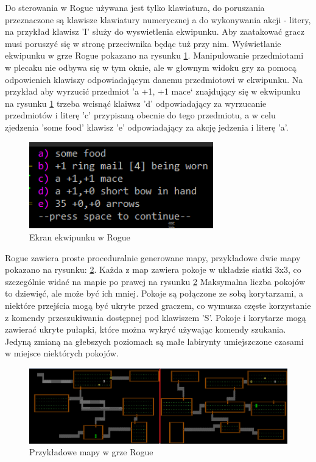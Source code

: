 \documentclass[12pt,twoside]{article}
\begin{document}
Do sterowania w Rogue używana jest tylko klawiatura, do poruszania przeznaczone są klawisze klawiatury numerycznej a do wykonywania akcji -  litery, na przykład klawisz 'I' służy do wyswietlenia ekwipunku. Aby zaatakować gracz musi poruszyć się w stronę przeciwnika będąc tuż przy nim. Wyświetlanie ekwipunku w grze Rogue pokazano na rysunku \ref{Rogue:scr2}. Manipulowanie przedmiotami w plecaku nie odbywa się w tym oknie, ale w głownym widoku gry za pomocą odpowienich klawiszy odpowiadającym danemu przedmiotowi w ekwipunku. Na przykład aby wyrzucić przedmiot 'a +1, +1 mace` znajdujący się w ekwipunku na rysunku \ref{Rogue:scr2} trzeba wcisnąć klaiwsz 'd' odpowiadający za wyrzucanie przedmiotów i literę 'c' przypisaną obecnie do tego przedmiotu, a w celu zjedzenia 'some food' klawisz 'e' odpowiadający za akcję jedzenia i literę 'a'. 

\FloatBarrier
\begin{figure}[h]
	\centering
	\includegraphics[width=8cm]{images/rogue/scr2.png}
	\caption{Ekran ekwipunku w Rogue}
	\label{Rogue:scr2}
\end{figure}
\FloatBarrier

Rogue zawiera proste proceduralnie generowane mapy, przykładowe dwie mapy pokazano na rysunku: \ref{Rogue:scr3}. Każda z map zawiera pokoje w układzie siatki 3x3, co szczególnie widać na mapie po prawej na rysunku \ref{Rogue:scr3} Maksymalna liczba pokojów to dziewięć, ale może być ich mniej. Pokoje są połączone ze sobą korytarzami, a niektóre przejścia mogą być ukryte przed graczem, co wymusza częste korzystanie z komendy przeszukiwania dostępnej pod klawiszem 'S'. Pokoje i korytarze mogą zawierać ukryte pułapki, które można wykryć używając komendy szukania. Jedyną zmianą na głebszych poziomach są małe labirynty umiejszczone czasami w miejsce niektórych pokojów.

\FloatBarrier
\begin{figure}[h]
	\centering
	\includegraphics[width=16cm]{images/rogue/scr3.png}
	\caption{Przykładowe mapy w grze Rogue}
	\label{Rogue:scr3}
\end{figure}
\FloatBarrier
\end{document}
